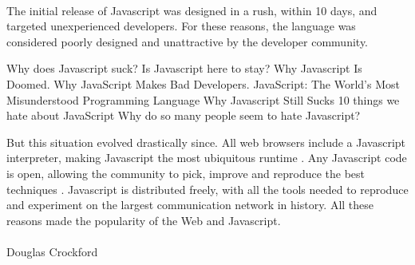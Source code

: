 \paragraph{}

The initial release of Javascript was designed in a rush, within 10 days, and targeted unexperienced developers.
For these reasons, the language was considered poorly designed and unattractive by the developer community.


{
\fontsize{10pt}{10pt}\selectfont
Why does Javascript suck?
Is Javascript here to stay?
Why Javascript Is Doomed.
Why JavaScript Makes Bad Developers.
JavaScript: The World's Most Misunderstood Programming Language
Why Javascript Still Sucks
10 things we hate about JavaScript
Why do so many people seem to hate Javascript?
}

But this situation evolved drastically since.
All web browsers include a Javascript interpreter, making Javascript the most ubiquitous runtime \cite{Flanagan2006}.
Any Javascript code is open, allowing the community to pick, improve and reproduce the best techniques .
Javascript is distributed freely, with all the tools needed to reproduce and experiment on the largest communication network in history.
All these reasons made the popularity of the Web and Javascript.


\paragraph{}

%
{Douglas Crockford}

